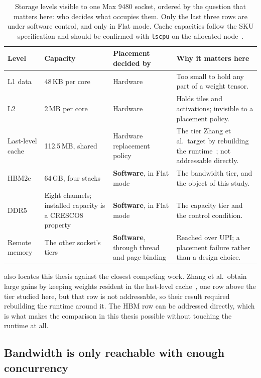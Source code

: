 \begin{table}[htbp]
\centering
\small
\tabsetup
\caption{Storage levels visible to one Max 9480 socket, ordered by the
question that matters here: who decides what occupies them.  Only the
last three rows are under software control, and only in Flat mode.
Cache capacities follow the SKU specification and should be confirmed
with \texttt{lscpu} on the allocated node~\cite{intel9480,lp1603}.}
\label{tab:storage-levels}
\begin{tabularx}{\textwidth}{@{}P{2.35cm}P{3.05cm}P{3.15cm}Y@{}}
\toprule
\headrow
\textbf{Level} & \textbf{Capacity} & \textbf{Placement decided by} &
\textbf{Why it matters here} \\
\midrule
L1 data & 48\,KB per core & Hardware & Too small to hold any part of a
  weight tensor. \\
L2 & 2\,MB per core & Hardware & Holds tiles and activations; invisible
  to a placement policy. \\
Last-level cache & 112.5\,MB, shared & Hardware replacement policy &
  The tier Zhang et al.\ target by rebuilding the
  runtime~\cite{zhang2026cacheresident}; not addressable directly. \\
\addlinespace[2pt]
HBM2e & 64\,GB, four stacks & \textbf{Software}, in Flat mode &
  The bandwidth tier, and the object of this study. \\
DDR5 & Eight channels; installed capacity is a CRESCO8 property &
  \textbf{Software}, in Flat mode & The capacity tier and the control
  condition. \\
Remote memory & The other socket's tiers & \textbf{Software}, through
  thread and page binding & Reached over UPI; a placement failure rather
  than a design choice. \\
\bottomrule
\end{tabularx}
\end{table}

 also locates this thesis against the
closest competing work.
Zhang et al.\ obtain large gains by keeping weights resident in the
last-level cache~\cite{zhang2026cacheresident}, one row above the tier
studied here, but that row is not addressable, so their result required
rebuilding the runtime around it.  The HBM row can be
addressed directly, which is what makes the comparison in this thesis
possible without touching the runtime at all.

\subsection{Bandwidth is only reachable with enough concurrency}
\label{sec:littles-law}

